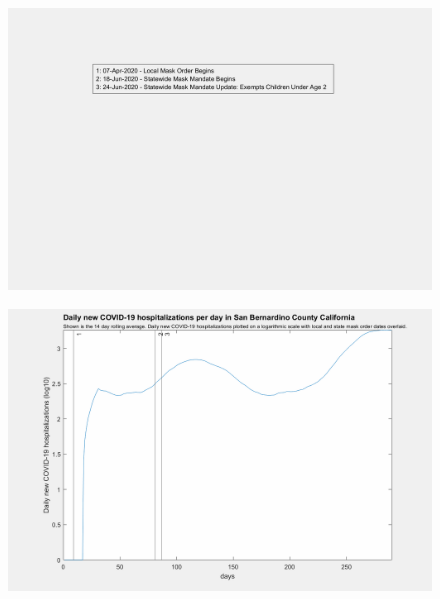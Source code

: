 \documentclass[]{article}
\begin{document}
\begin{figure}[!h]
	\includegraphics[width=\linewidth]{legends/san_bernardino_mask_order_legend.png}
	\caption{}
	\label{fig:legends/san_bernardino_mask_order_legendLabel}
\end{figure}

\begin{figure}[!h]
	\includegraphics[width=\linewidth]{images/san_bernardino_mask_order_hospitalizations_log.png}
	\caption{}
	\label{fig:images/san_bernardino_mask_order_hospitalizations_logLabel}
\end{figure}
\end{document}
